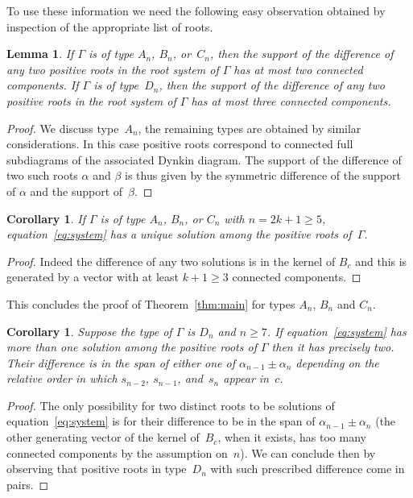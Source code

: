 \documentclass[pdftex]{sigma}
\numberwithin{equation}{section}
\newtheorem{Corollary}[Theorem]{Corollary}
\newtheorem{Lemma}[Theorem]{Lemma}
\begin{document}
  To use these information we need the following easy observation obtained by inspection of the appropriate list of roots.
  \begin{Lemma} \label{lem:components}
    If $\Gamma$ is of type $A_n$, $B_n$, or~$C_n$, then the support of the difference of any two positive roots in the root system of $\Gamma$ has at most two connected components.
    If $\Gamma$ is of type~$D_n$, then the support of the difference of any two positive roots in the root system of $\Gamma$ has at most three connected components.
  \end{Lemma}

  \begin{proof}
    We discuss type~$A_n$, the remaining types are obtained by similar considerations.
    In this case positive roots correspond to connected full subdiagrams of the associated Dynkin diagram.
    The support of the dif\/ference of two such roots $\alpha$ and $\beta$ is thus given by the symmetric dif\/ference of the support of $\alpha$ and the support of~$\beta$.
  \end{proof}

  \begin{Corollary}
    If $\Gamma$ is of type $A_n$, $B_n$, or $C_n$ with $n=2k+1\geq 5$, equation~\eqref{eq:system} has a unique solution among the positive roots of~$\Gamma$.
  \end{Corollary}
  \begin{proof}
    Indeed the dif\/ference of any two solutions is in the kernel of $B_c$ and this is generated by a vector with at least $k+1\geq3$ connected components.
  \end{proof}

  This concludes the proof of Theorem~\ref{thm:main} for types $A_n$, $B_n$ and $C_n$.

  \begin{Corollary} \label{cor:kernel-Dn} 
    Suppose the type of $\Gamma$ is $D_n$ and $n\geq 7$.
    If equation~\eqref{eq:system} has more than one solution among the positive roots of $\Gamma$ then it has precisely two.
    Their difference is in the span of either one of $\alpha_{n-1}\pm\alpha_n$ depending on the relative order in which $s_{n-2}$, $s_{n-1}$, and~$s_n$ appear in~$c$.
  \end{Corollary}
  \begin{proof}
    The only possibility for two distinct roots to be solutions of equation~\eqref{eq:system} is for their dif\/ference to be in the span of $\alpha_{n-1}\pm\alpha_n$ (the other generating vector of the kernel of~$B_c$, when it exists, has too many connected components by the assumption on~$n$).
    We can conclude then by observing that positive roots in type~$D_n$ with such prescribed dif\/ference come in pairs.
  \end{proof}
\end{document}
